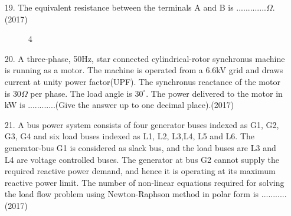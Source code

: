 \documentclass[journal]{IEEEtran}
\begin{document}
\begin{enumerate}
    \item[19.] The equivalent resistance between the terminals A and B is .............$\Omega$.\hfill (2017)
    \begin{figure}[!ht]
        \centering
        \caption{4}
    \end{figure}
    \item[20.] A three-phase, 50Hz, star connected cylindrical-rotor synchronus machine is running as a motor. The machine is operated from a 6.6kV grid and draws current at unity power factor(UPF). The synchronus reactance of the motor is $30\Omega$ per phase. The load angle is $30^{\circ}$. The power delivered to the motor in kW is ............(Give the answer up to one decimal place).\hfill (2017)
    \item[21.] A bus power system consists of four generator buses indexed as G1, G2, G3, G4 and six load buses indexed as L1, L2, L3,L4, L5 and L6. The generator-bus G1 is considered as slack bus, and the load buses are L3 and L4 are voltage controlled buses. The generator at bus G2 cannot supply the required reactive power demand, and hence it is operating at its maximum reactive power limit. The number of non-linear equations required for solving the load flow problem using Newton-Raphson method in polar form is ...........\hfill (2017)

\end{enumerate}
\end{document}
